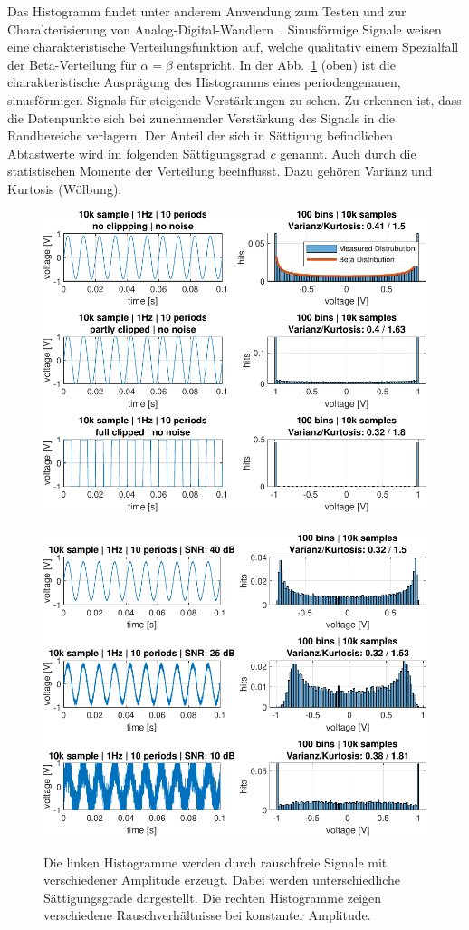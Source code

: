 Das Histogramm findet unter anderem Anwendung zum Testen und zur Charakterisierung von Analog-Digital-Wandlern~\cite{Gamad-2009}. Sinusförmige Signale weisen eine charakteristische Verteilungsfunktion auf, welche qualitativ einem Spezialfall der Beta-Verteilung für $\alpha = \beta$ entspricht. In der Abb.~\ref{fig:Histogramm-Gain} (oben) ist die charakteristische Ausprägung des Histogramms eines periodengenauen, sinusförmigen Signals für steigende Verstärkungen zu sehen. Zu erkennen ist, dass die Datenpunkte sich bei zunehmender Verstärkung des Signals in die Randbereiche verlagern. Der Anteil der sich in Sättigung befindlichen Abtastwerte wird im folgenden Sättigungsgrad $c$ genannt. Auch durch die statistischen Momente der Verteilung beeinflusst. Dazu gehören Varianz und Kurtosis (Wölbung).
\begin{figure}[h!] 
	\hspace*{-2mm}
	\centering 
	\includegraphics[width=1.05\columnwidth]{../img/beta-distribution.pdf}~~~~~
	\includegraphics[width=1.05\columnwidth]{../img/noise-histogramm.pdf}
	\caption{Die linken Histogramme werden durch rauschfreie Signale mit verschiedener Amplitude erzeugt. Dabei werden unterschiedliche Sättigungsgrade dargestellt. Die rechten Histogramme zeigen verschiedene Rauschverhältnisse bei konstanter Amplitude.}
	\label{fig:Histogramm-Gain}
\end{figure} 
